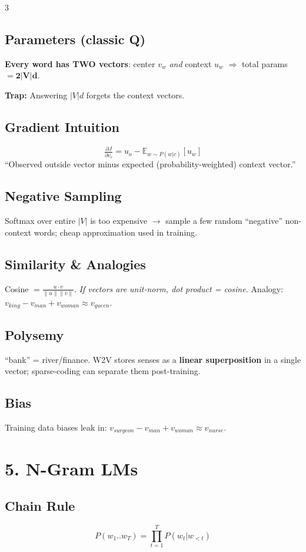 \documentclass[8pt,a4paper,landscape]{extarticle}
\newcommand{\trap}[1]{{\small\colorbox{yellow!30}{\parbox{0.93\linewidth}{\textbf{\textcolor{red!70!black}{Trap:}} #1}}}}
\begin{document}
\begin{multicols*}{3}
    \subsection*{Parameters (classic Q)}
    \textbf{Every word has TWO vectors}: center $v_w$ \emph{and} context $u_w$ $\Rightarrow$ total params $=\mathbf{2|V|d}$.
    \trap{Answering $|V|d$ forgets the context vectors.}

    \subsection*{Gradient Intuition}
    \[\tfrac{\partial J}{\partial v_c}=u_o-\mathbb{E}_{w\sim P(w|c)}[u_w]\]
    ``Observed outside vector minus expected (probability-weighted) context vector.''

    \subsection*{Negative Sampling}
    Softmax over entire $|V|$ is too expensive $\to$ sample a few random ``negative'' non-context words; cheap approximation used in training.

    \subsection*{Similarity \& Analogies}
    Cosine $=\tfrac{u\cdot v}{\|u\|\|v\|}$. \emph{If vectors are unit-norm, dot product = cosine.} Analogy: $v_{king}-v_{man}+v_{woman}\approx v_{queen}$.

    \subsection*{Polysemy}
    ``bank'' = river/finance. W2V stores senses as a \textbf{linear superposition} in a single vector; sparse-coding can separate them post-training.

    \subsection*{Bias}
    Training data biases leak in: $v_{surgeon}-v_{man}+v_{woman}\approx v_{nurse}$.

    \section*{5. N-Gram LMs}

    \subsection*{Chain Rule}
    \[P(w_1..w_T)=\prod_{t=1}^{T}P(w_t|w_{<t})\]


\end{multicols*}
\end{document}
